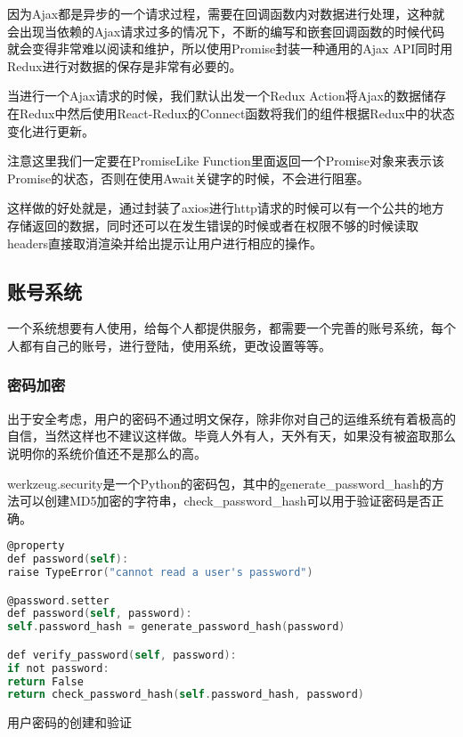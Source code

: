 因为Ajax都是异步的一个请求过程，需要在回调函数内对数据进行处理，这种就会出现当依赖的Ajax请求过多的情况下，不断的编写和嵌套回调函数的时候代码就会变得非常难以阅读和维护，所以使用Promise封装一种通用的Ajax API同时用Redux进行对数据的保存是非常有必要的。

当进行一个Ajax请求的时候，我们默认出发一个Redux Action将Ajax的数据储存在Redux中然后使用React-Redux的Connect函数将我们的组件根据Redux中的状态变化进行更新。

注意这里我们一定要在PromiseLike Function里面返回一个Promise对象来表示该Promise的状态，否则在使用Await关键字的时候，不会进行阻塞。

这样做的好处就是，通过封装了axios进行http请求的时候可以有一个公共的地方存储返回的数据，同时还可以在发生错误的时候或者在权限不够的时候读取headers直接取消渲染并给出提示让用户进行相应的操作。

\subsection{账号系统}

一个系统想要有人使用，给每个人都提供服务，都需要一个完善的账号系统，每个人都有自己的账号，进行登陆，使用系统，更改设置等等。

\subsubsection{密码加密}

出于安全考虑，用户的密码不通过明文保存，除非你对自己的运维系统有着极高的自信，当然这样也不建议这样做。毕竟人外有人，天外有天，如果没有被盗取那么说明你的系统价值还不是那么的高。

werkzeug.security是一个Python的密码包，其中的generate\_password\_hash的方法可以创建MD5加密的字符串，check\_password\_hash可以用于验证密码是否正确。

\begin{lstlisting}[language=C]
@property
def password(self):
raise TypeError("cannot read a user's password")

@password.setter
def password(self, password):
self.password_hash = generate_password_hash(password)

def verify_password(self, password):
if not password:
return False
return check_password_hash(self.password_hash, password)
\end{lstlisting}

\begin{center}
	{\small 用户密码的创建和验证}
\end{center}

